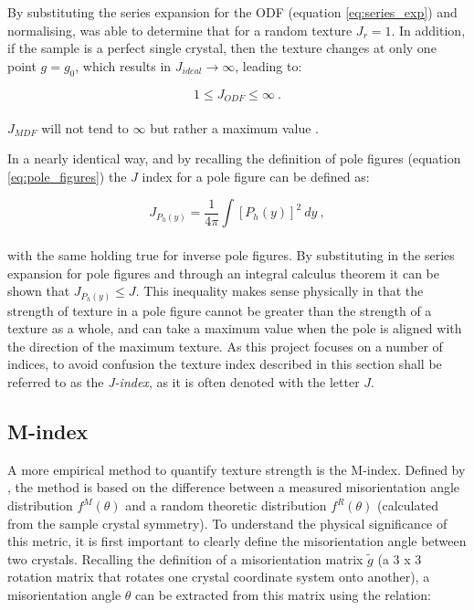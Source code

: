 \documentclass[a4paper,12pt,twoside]{report}
\numberwithin{equation}{chapter}
\begin{document}
By substituting the series expansion for the ODF (equation \ref{eq:series_exp})  and normalising, \cite{bunge1982texture} was able to determine that for a random texture $J_r = 1$. In addition, if the sample is a perfect single crystal, then the texture changes at only one point $g = g_0$, which results in $J_{ideal} \to \infty$, leading to:

\begin{equation}
1 \leq J_{ODF} \leq \infty\ .
\end{equation}
\\
$J_{MDF}$ will not tend to $\infty$ but rather a maximum value \citep{Mainprice}.

In a nearly identical way, and by recalling the definition of pole figures (equation \ref{eq:pole_figures}) the $J$ index for a pole figure can be defined as:
 
\begin{equation}
J_{P_h(y)} = \frac{1}{4\pi} \int [ P_{h}(y) ]^2\ dy\ ,
\end{equation}
\\
with the same holding true for inverse pole figures. By substituting in the series expansion for pole figures and through an integral calculus theorem \citep[p.90]{bunge1982texture} it can be shown that $J_{P_h(y)} \leq J$. This inequality makes sense physically in that the strength of texture in a pole figure cannot be greater than the strength of a texture as a whole, and can take a maximum value when the pole is aligned with the direction of the maximum texture. As this project focuses on a number of indices, to avoid confusion the texture index described in this section shall be referred to as the \emph{J-index}, as it is often denoted with the letter $J$.


\subsection{M-index} \label{subsec:Mindex}
A more empirical method to quantify texture strength is the M-index. Defined by \cite{Skemer}, the method is based on the difference between a measured misorientation angle distribution $f^M(\theta)$ and a random theoretic distribution $f^R(\theta)$ (calculated from the sample crystal symmetry). To understand the physical significance of this metric, it is first important to clearly define the misorientation angle between two crystals. Recalling the definition of a misorientation matrix $\tilde{g}$ (a 3 x 3 rotation matrix that rotates one crystal coordinate system onto another), a misorientation angle $\theta$ can be extracted from this matrix using the relation:
\end{document}
